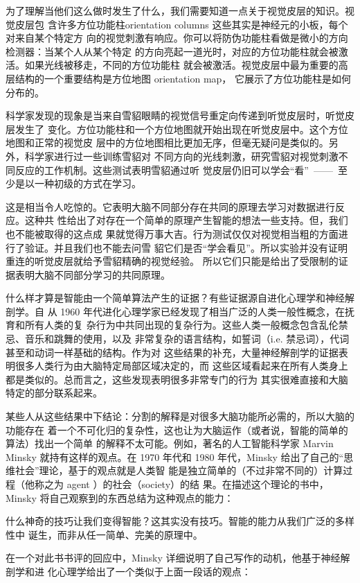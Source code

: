 为了理解当他们这么做时发生了什么，我们需要知道一点关于视觉皮层的知识。视觉皮层包
含许多方位功能柱orientation columns 这些其实是神经元的小板，每个对来自某个特定方
向的视觉刺激有响应。你可以将防伪功能柱看做是微小的方向检测器：当某个人从某个特定
的方向亮起一道光时，对应的方位功能柱就会被激活。如果光线被移走，不同的方位功能柱
就会被激活。视觉皮层中最为重要的高层结构的一个重要结构是方位地图 orientation map，
它展示了方位功能柱是如何分布的。

科学家发现的现象是当来自雪貂眼睛的视觉信号重定向传递到听觉皮层时，听觉皮层发生了
变化。方位功能柱和一个方位地图就开始出现在听觉皮层中。这个方位地图和正常的视觉皮
层中的方位地图相比更加无序，但毫无疑问是类似的。另外，科学家进行过一些训练雪貂对
不同方向的光线刺激，研究雪貂对视觉刺激不同反应的工作机制。这些测试表明雪貂通过听
觉皮层仍旧可以学会“看”~——~至少是以一种初级的方式在学习。

这是相当令人吃惊的。它表明大脑不同部分存在共同的原理去学习对数据进行反应。这种共
性给出了对存在一个简单的原理产生智能的想法一些支持。但，我们也不能被取得的这点成
果就觉得万事大吉。行为测试仅仅对视觉相当粗的方面进行了验证。并且我们也不能去问雪
貂它们是否“学会看见”。所以实验并没有证明重连的听觉皮层就给予雪貂精确的视觉经验。
所以它们只能是给出了受限制的证据表明大脑不同部分学习的共同原理。

什么样才算是智能由一个简单算法产生的证据？有些证据源自进化心理学和神经解剖学。自
从 1960 年代进化心理学家已经发现了相当广泛的人类一般性概念，在抚育和所有人类的复
杂行为中共同出现的复杂行为。这些人类一般概念包含乱伦禁忌、音乐和跳舞的使用，以及
非常复杂的语言结构，如誓词（i.e. 禁忌词），代词甚至和动词一样基础的结构。作为对
这些结果的补充，大量神经解剖学的证据表明很多人类行为由大脑特定局部区域决定的，而
这些区域看起来在所有人类身上都是类似的。总而言之，这些发现表明很多非常专门的行为
其实很难直接和大脑特定的部分联系起来。

某些人从这些结果中下结论：分割的解释是对很多大脑功能所必需的，所以大脑的功能存在
着一个不可化归的复杂性，这也让为大脑运作（或者说，智能的简单的算法）找出一个简单
的解释不太可能。例如，著名的人工智能科学家 Marvin Minsky 就持有这样的观点。在
1970 年代和 1980 年代，Minsky 给出了自己的“思维社会”理论，基于的观点就是人类智
能是独立简单的（不过非常不同的）计算过程（他称之为 agent ）的社会（society）的结
果。在描述这个理论的书中，Minsky 将自己观察到的东西总结为这种观点的能力：

    什么神奇的技巧让我们变得智能？这其实没有技巧。智能的能力从我们广泛的多样性中
    诞生，而非从任一简单、完美的原理中。

在一个对此书书评的回应中，Minsky 详细说明了自己写作的动机，他基于神经解剖学和进
化心理学给出了一个类似于上面一段话的观点：

